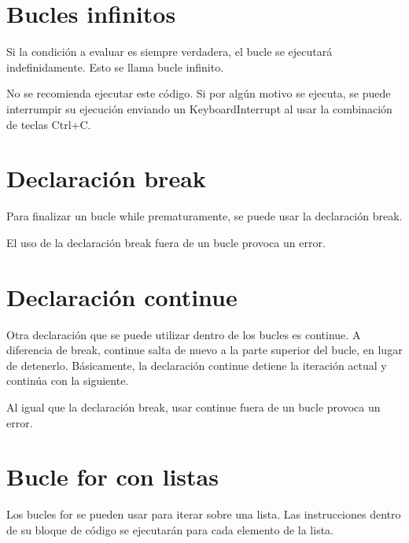 \documentclass{report}
\begin{document}

\section{Bucles infinitos}

Si la condición a evaluar es siempre verdadera, el bucle se ejecutará indefinidamente. Esto se llama bucle infinito.


No se recomienda ejecutar este código. Si por algún motivo se ejecuta, se puede interrumpir su ejecución enviando un KeyboardInterrupt al usar la combinación de teclas Ctrl+C.

\section{Declaración break}

Para finalizar un bucle while prematuramente, se puede usar la declaración break.


El uso de la declaración break fuera de un bucle provoca un error.


\section{Declaración continue}

Otra declaración que se puede utilizar dentro de los bucles es continue. A diferencia de break, continue salta de nuevo a la parte superior del bucle, en lugar de detenerlo. Básicamente, la declaración continue detiene la iteración actual y continúa con la siguiente.


Al igual que la declaración break, usar continue fuera de un bucle provoca un error.


\section{Bucle for con listas}

Los bucles for se pueden usar para iterar sobre una lista. Las instrucciones dentro de su bloque de código se ejecutarán para cada elemento de la lista.
\end{document}
